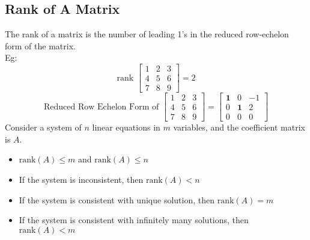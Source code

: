 \documentclass{article}
\begin{document}
\subsection{Rank of A Matrix}
The rank of a matrix is the number of leading 1's in the reduced row-echelon form of the matrix.\\
Eg: $$\text{rank } \begin{bmatrix}
    1 & 2 & 3 \\
    4 & 5 & 6 \\
    7 & 8 & 9
    \end{bmatrix} = 2$$
    $$\text{Reduced Row Echelon Form of } \begin{bmatrix}
        1 & 2 & 3 \\
        4 & 5 & 6 \\
        7 & 8 & 9
        \end{bmatrix} = \begin{bmatrix}
            \textbf{1} & 0 & -1 \\
            0 & \textbf{1} & 2 \\
            0 & 0 & 0
        \end{bmatrix}$$
Consider a system of $n$ linear equations in $m$ variables, and the coefficient matrix is $A$.
        \begin{itemize}
    \item $\text{rank}(A) \le m$ and $\text{rank}(A) \le n$
    \item If the system is inconsistent, then $\text{rank}(A) < n$
    \item If the system is consistent with unique solution, then $\text{rank}(A) = m$
    \item If the system is consistent with infinitely many solutions, then $\text{rank}(A) < m$
\end{itemize}
\end{document}
